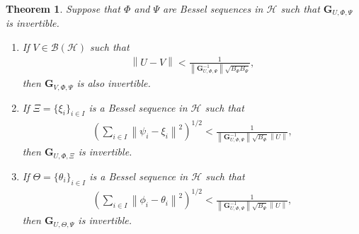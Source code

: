 \documentclass{birkjour}
\newtheorem{thm}{Theorem}[section]
\theoremstyle{definition}
\theoremstyle{remark}
\numberwithin{equation}{section}
\newcommand{\BL}[1]{
{\mathcal B} \left( #1 \right)
}
\begin{document}
 \begin{thm}
 Suppose that $\Phi$ and $\Psi$ are  Bessel sequences in $\mathcal{H}$  such that $\mathbf{G}_{U,\Phi,\Psi}$ is invertible.
 \begin{enumerate}
 \item[(1)] If $V\in \BL{\mathcal{H}}$ such that
\begin{eqnarray}\label{C1}
 \left\|U-V\right\|<\frac{1}{\left\|\mathbf{G}_
 {U,\Phi,\Psi}^{-1}\right\|\sqrt{B_{\Phi}B_{\Psi}}},
\end{eqnarray}
 then $\mathbf{G}_{V,\Phi,\Psi}$ is also invertible.
\item[(2)] If $\Xi=\{\xi_{i}\}_{i\in I}$ is a Bessel
    sequence in $\mathcal{H}$ such that
\begin{eqnarray}\label{C2}
\left(\sum_{i\in I}\left\|\psi_{i}-\xi_{i}\right\|^{2}\right)^{1/2}< \frac{1}{\left\|\mathbf{G}_
 {U,\Phi,\Psi}^{-1}\right\|\sqrt{B_{\Phi}}\left\|U\right\|},
\end{eqnarray}
 then $\mathbf{G}_{U,\Phi,\Xi}$ is invertible.

\item[(3)] If $\Theta=\{\theta_{i}\}_{i\in I}$ is a
    Bessel sequence in $\mathcal{H}$ such that
    \begin{eqnarray*}\label{C3}
\left(\sum_{i\in I}\left\|\phi_{i}-\theta_{i}\right\|^{2}\right)^{1/2}< \frac{1}{\left\|\mathbf{G}_
 {U,\Phi,\Psi}^{-1}\right\|\sqrt{B_{\Psi}}\left\|U\right\|},
    \end{eqnarray*}
    then $\mathbf{G}_{U,\Theta,\Psi}$ is invertible.
 \end{enumerate}
 \end{thm}
\end{document}
